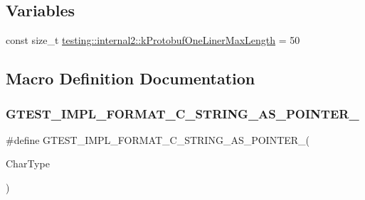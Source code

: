 \subsection*{Variables}
\begin{DoxyCompactItemize}
\item 
const size\+\_\+t \mbox{\hyperlink{namespacetesting_1_1internal2_a140c8efd51e63a3def98445bff107518}{testing\+::internal2\+::k\+Protobuf\+One\+Liner\+Max\+Length}} = 50
\end{DoxyCompactItemize}


\subsection{Macro Definition Documentation}
\mbox{\label{gtest-printers_8h_a79d4724b4bc2a1dd8493c366b5ca626a}} 
\subsubsection{\texorpdfstring{GTEST\_IMPL\_FORMAT\_C\_STRING\_AS\_POINTER\_}{GTEST\_IMPL\_FORMAT\_C\_STRING\_AS\_POINTER\_}}
{\footnotesize\ttfamily \#define G\+T\+E\+S\+T\+\_\+\+I\+M\+P\+L\+\_\+\+F\+O\+R\+M\+A\+T\+\_\+\+C\+\_\+\+S\+T\+R\+I\+N\+G\+\_\+\+A\+S\+\_\+\+P\+O\+I\+N\+T\+E\+R\+\_\+(\begin{DoxyParamCaption}\item[{}]{Char\+Type }\end{DoxyParamCaption})}

